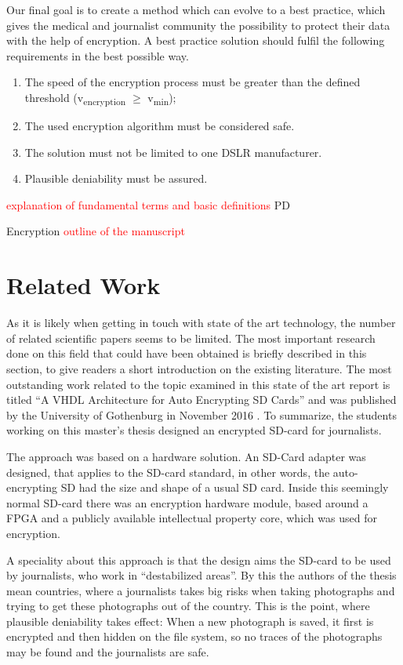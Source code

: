 \documentclass[12pt,a4paper,titlepage,oneside]{scrartcl}
\newcommand\todo[1]{\textcolor{red}{#1}}
\begin{document}
Our final goal is to create a method which can evolve to a best practice, which gives the medical and journalist community the possibility to protect their data with the help of encryption.
A best practice solution should fulfil the following requirements in the best possible way.
\begin{enumerate}
  \item The speed of the encryption process must be greater than the defined threshold (v\textsubscript{encryption} $\geq$ v\textsubscript{min});
  \item The used encryption algorithm must be considered safe.
  \item The solution must not be limited to one DSLR manufacturer.
  \item Plausible deniability must be assured.
\end{enumerate}

\todo{explanation of fundamental terms and basic definitions}
PD

Encryption
\todo{outline of the manuscript}


\newpage
\section{Related Work}
As it is likely when getting in touch with state of the art technology, the number of related scientific papers seems to be limited.
The most important research done on this field that could have been obtained is briefly described in this section, to give readers a short introduction on the existing literature. 
The most outstanding work related to the topic examined in this state of the art report is titled ``A VHDL Architecture for Auto Encrypting SD Cards'' and was published by the University of Gothenburg in November 2016 \cite{Davidsson2016}.
To summarize, the students working on this master's thesis designed an encrypted SD-card for journalists.

The approach was based on a hardware solution.
An SD-Card adapter was designed, that applies to the SD-card standard, in other words, the auto-encrypting SD had the size and shape of a usual SD card.
Inside this seemingly normal SD-card there was an encryption hardware module, based around a FPGA and a publicly available intellectual property core, which was used for encryption.

A speciality about this approach is that the design aims the SD-card to be used by journalists, who work in ``destabilized areas''.
By this the authors of the thesis mean countries, where a journalists takes big risks when taking photographs and trying to get these photographs out of the country.
This is the point, where plausible deniability takes effect: When a new photograph is saved, it first is encrypted and then hidden on the file system, so no traces of the photographs may be found and the journalists are safe.
\end{document}
